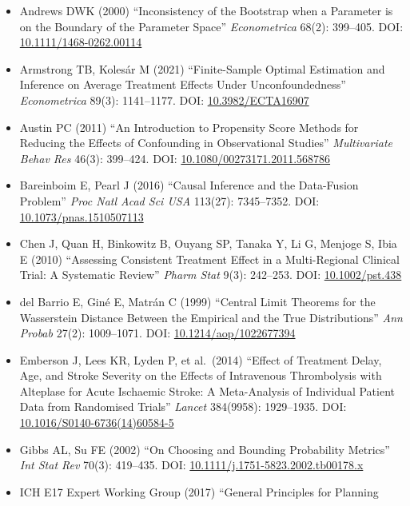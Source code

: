 \documentclass[
  a4paper,
  11pt]{ltjsarticle}
\providecommand{\tightlist}{%
  \setlength{\itemsep}{0pt}\setlength{\parskip}{0pt}}\usepackage{longtable,booktabs,array}
\begin{document}
\begin{itemize}
\tightlist
\item
  Andrews DWK (2000) ``Inconsistency of the Bootstrap when a Parameter
  is on the Boundary of the Parameter Space'' \emph{Econometrica} 68(2):
  399--405. DOI:
  \href{https://doi.org/10.1111/1468-0262.00114}{10.1111/1468-0262.00114}
\item
  Armstrong TB, Kolesár M (2021) ``Finite-Sample Optimal Estimation and
  Inference on Average Treatment Effects Under Unconfoundedness''
  \emph{Econometrica} 89(3): 1141--1177. DOI:
  \href{https://doi.org/10.3982/ECTA16907}{10.3982/ECTA16907}
\item
  Austin PC (2011) ``An Introduction to Propensity Score Methods for
  Reducing the Effects of Confounding in Observational Studies''
  \emph{Multivariate Behav Res} 46(3): 399--424. DOI:
  \href{https://doi.org/10.1080/00273171.2011.568786}{10.1080/00273171.2011.568786}
\item
  Bareinboim E, Pearl J (2016) ``Causal Inference and the Data-Fusion
  Problem'' \emph{Proc Natl Acad Sci USA} 113(27): 7345--7352. DOI:
  \href{https://doi.org/10.1073/pnas.1510507113}{10.1073/pnas.1510507113}
\item
  Chen J, Quan H, Binkowitz B, Ouyang SP, Tanaka Y, Li G, Menjoge S,
  Ibia E (2010) ``Assessing Consistent Treatment Effect in a
  Multi-Regional Clinical Trial: A Systematic Review'' \emph{Pharm Stat}
  9(3): 242--253. DOI:
  \href{https://doi.org/10.1002/pst.438}{10.1002/pst.438}
\item
  del Barrio E, Giné E, Matrán C (1999) ``Central Limit Theorems for the
  Wasserstein Distance Between the Empirical and the True
  Distributions'' \emph{Ann Probab} 27(2): 1009--1071. DOI:
  \href{https://doi.org/10.1214/aop/1022677394}{10.1214/aop/1022677394}
\item
  Emberson J, Lees KR, Lyden P, et al.~(2014) ``Effect of Treatment
  Delay, Age, and Stroke Severity on the Effects of Intravenous
  Thrombolysis with Alteplase for Acute Ischaemic Stroke: A
  Meta-Analysis of Individual Patient Data from Randomised Trials''
  \emph{Lancet} 384(9958): 1929--1935. DOI:
  \href{https://doi.org/10.1016/S0140-6736(14)60584-5}{10.1016/S0140-6736(14)60584-5}
\item
  Gibbs AL, Su FE (2002) ``On Choosing and Bounding Probability
  Metrics'' \emph{Int Stat Rev} 70(3): 419--435. DOI:
  \href{https://doi.org/10.1111/j.1751-5823.2002.tb00178.x}{10.1111/j.1751-5823.2002.tb00178.x}
\item
  ICH E17 Expert Working Group (2017) ``General Principles for Planning

\end{itemize}
\end{document}
